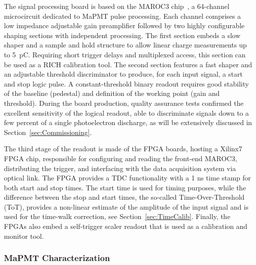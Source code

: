 \documentclass[5p,times,twocolumn]{elsarticle}
\begin{document}
The signal processing board is based on the MAROC3 chip~\cite{MAROC3:chip}, a 64-channel microcircuit
dedicated to MaPMT pulse processing. Each channel comprises a low impedance adjustable gain preamplifier followed
by two highly configurable shaping sections with independent processing. The first section embeds a slow shaper and
a sample and hold structure to allow linear charge measurements up to 5~pC. Requiring short trigger delays and
multiplexed access, this section can be used as a RICH calibration tool. The second section features a fast shaper and
an adjustable threshold discriminator to produce, for each input signal, a start and stop logic pulse. A constant-threshold
binary readout requires good stability of the baseline (pedestal) and definition of the working point (gain and
threshold). During the board production, quality assurance tests confirmed the excellent sensitivity of the logical
readout, able to discriminate signals down to a few percent of a single photoelectron discharge, as will be extensively
discussed in Section~\ref{sec:Commissioning}.

The third stage of the readout is made of the FPGA boards, hosting a Xilinx7 FPGA chip, responsible for configuring
and reading the front-end MAROC3, distributing the trigger, and interfacing with the data acquisition system
\cite{daq-nim} via optical link. The FPGA provides a TDC functionality with a 1 ns time stamp for both start and stop
times. The start time is used for timing purposes, while the difference between the stop and start times, the so-called
Time-Over-Threshold (ToT), provides a non-linear estimate of the amplitude of the input signal and is used for the
time-walk correction, see Section~\ref{sec:TimeCalib}. Finally, the FPGAs also embed a self-trigger scaler readout that is used
as a calibration and monitor tool.

\subsubsection{MaPMT Characterization}
\label{sec:FEtests}
\end{document}

